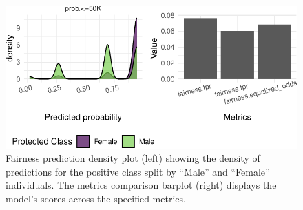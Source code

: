 \begin{Shaded}
\begin{Highlighting}[]

\OtherTok{=} 
\OtherTok{=} 
  \NormalTok{(}\NormalTok{(}\NormalTok{, }\NormalTok{, }\NormalTok{)),}
\NormalTok{)}

\SpecialCharTok{+}\SpecialCharTok{*}
  \NormalTok{() }\SpecialCharTok{*}
  \NormalTok{(} \NormalTok{, } \NormalTok{) }\SpecialCharTok{*}
  \NormalTok{(}
     \NormalTok{(} \NormalTok{, }\NormalTok{),}
     
\NormalTok{  )}
\end{Highlighting}
\end{Shaded}

\begin{figure}[H]

{\centering \includegraphics[width=1\textwidth,height=\textheight]{chapters/chapter14/algorithmic_fairness_files/figure-pdf/fig-fairness-1.pdf}

}

\caption{\label{fig-fairness}Fairness prediction density plot (left)
showing the density of predictions for the positive class split by
``Male'' and ``Female'' individuals. The metrics comparison barplot
(right) displays the model's scores across the specified metrics.}

\end{figure}

